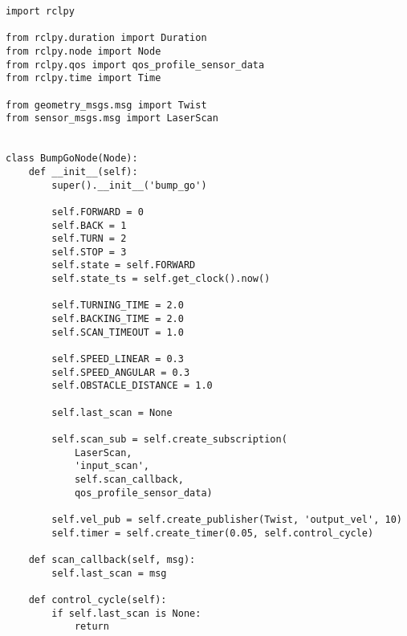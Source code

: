  \footnotesize
\begin{tcolorbox}[sharp corners, colframe=gray!80, colback=LightGray, left=0pt, top=0pt, bottom=0pt, title=\texttt{br2\_fsm\_bumpgo\_py/br2\_fsm\_bumpgo\_py/\_\_init\_\_.py}]
  \begin{verbatim}
    \end{verbatim}
    \end{tcolorbox}
  \normalsize

 \footnotesize
\begin{tcolorbox}[sharp corners, colframe=gray!80, colback=LightGray, left=0pt, top=0pt, bottom=0pt, title=\texttt{br2\_fsm\_bumpgo\_py/br2\_fsm\_bumpgo\_py/bump\_go\_main.py}]
  \begin{verbatim}
import rclpy

from rclpy.duration import Duration
from rclpy.node import Node
from rclpy.qos import qos_profile_sensor_data
from rclpy.time import Time

from geometry_msgs.msg import Twist
from sensor_msgs.msg import LaserScan


class BumpGoNode(Node):
    def __init__(self):
        super().__init__('bump_go')

        self.FORWARD = 0
        self.BACK = 1
        self.TURN = 2
        self.STOP = 3
        self.state = self.FORWARD
        self.state_ts = self.get_clock().now()

        self.TURNING_TIME = 2.0
        self.BACKING_TIME = 2.0
        self.SCAN_TIMEOUT = 1.0

        self.SPEED_LINEAR = 0.3
        self.SPEED_ANGULAR = 0.3
        self.OBSTACLE_DISTANCE = 1.0

        self.last_scan = None

        self.scan_sub = self.create_subscription(
            LaserScan,
            'input_scan',
            self.scan_callback,
            qos_profile_sensor_data)

        self.vel_pub = self.create_publisher(Twist, 'output_vel', 10)
        self.timer = self.create_timer(0.05, self.control_cycle)

    def scan_callback(self, msg):
        self.last_scan = msg

    def control_cycle(self):
        if self.last_scan is None:
            return


\end{verbatim}
\end{tcolorbox}
